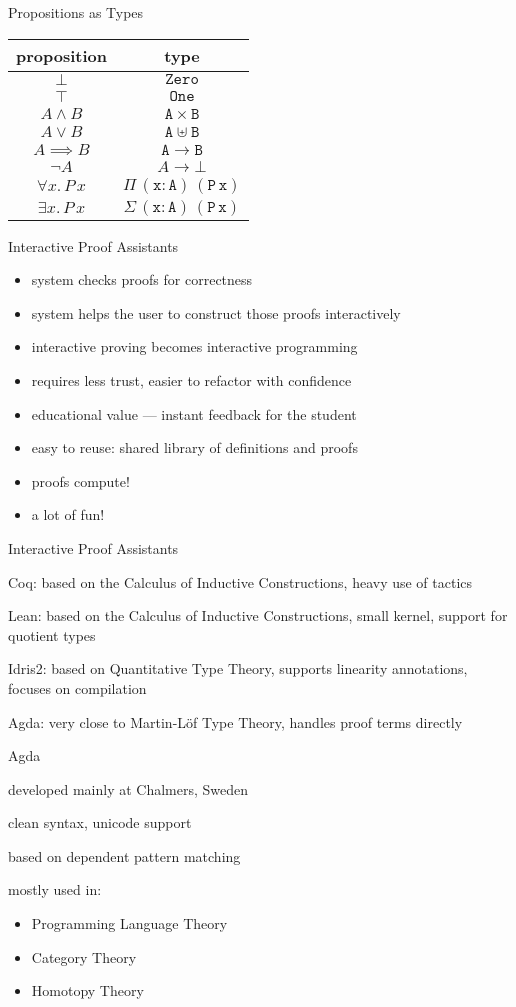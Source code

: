 \documentclass[dvipsnames]{beamer}
\newenvironment{wideitemize}{\itemize\addtolength{\itemsep}{1em}}{\enditemize}
\newcommand{\sitem}{\item[\raisebox{.45ex}{\rule{.6ex}{.6ex}}]}
\begin{document}
\begin{frame}{Propositions as Types}
\center
\begin{tabular}{ c | c }
  proposition & type \\ \hline{}
  $\bot$ & $\mathtt{Zero}$ \\
  $\top$ & $\mathtt{One}$ \\
  $A \land B$ & $\mathtt{A \times B}$ \\
  $A \lor B$ & $\mathtt{A \uplus B}$ \\
  $A \implies B$ & $\mathtt{A \to B}$ \\
  $\neg A$ & $A \to \bot$ \\
  $\forall x . \, P \, x$ & $\mathtt{\Pi \, (x : A) \, (P \, x)}$ \\
  $\exists x . \, P \, x$ & $\mathtt{\Sigma \, (x : A) \, (P \, x)}$ \\
\end{tabular}
\end{frame}

\begin{frame}{Interactive Proof Assistants}
\begin{itemize}
  \sitem system checks proofs for correctness
  \sitem system helps the user to construct those proofs interactively
  \sitem interactive proving becomes interactive programming
  \sitem requires less trust, easier to refactor with confidence
  \sitem educational value --- instant feedback for the student
  \sitem easy to reuse: shared library of definitions and proofs
  \sitem proofs compute!
  \sitem a lot of fun!
\end{itemize}
\end{frame}

\begin{frame}{Interactive Proof Assistants}
  \begin{wideitemize}
  \sitem Coq: based on the Calculus of Inductive Constructions, heavy use of tactics
  \sitem Lean: based on the Calculus of Inductive Constructions, small kernel, support for quotient types
  \sitem Idris2: based on Quantitative Type Theory, supports linearity annotations, focuses on compilation
  \sitem Agda: very close to Martin-L\"of Type Theory, handles proof terms directly
  \end{wideitemize}
\end{frame}


\begin{frame}{Agda}
\begin{wideitemize}
  \sitem developed mainly at Chalmers, Sweden
  \sitem clean syntax, unicode support
  \sitem based on dependent pattern matching
  \sitem mostly used in:
    \begin{itemize}
      \sitem Programming Language Theory
      \sitem Category Theory
      \sitem Homotopy Theory
    \end{itemize}
\end{wideitemize}
\end{frame}
\end{document}
